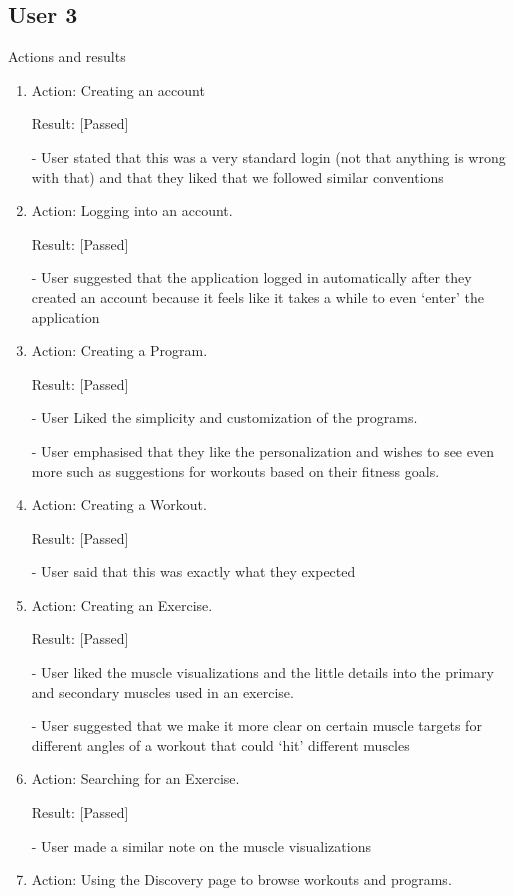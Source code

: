 \documentclass[12pt, titlepage]{article}
\begin{document}
\subsection{User 3}
Actions and results
\begin{enumerate}
\item Action: Creating an account

Result:  [Passed]

-	User stated that this was a very standard login (not that anything is wrong with that) and that they liked that we followed similar conventions

\item Action: Logging into an account.

Result: [Passed]

-	User suggested that the application logged in automatically after they created an account because it feels like it takes a while to even ‘enter’ the application


\item Action: Creating a Program.

Result: [Passed]

-	User Liked the simplicity and customization of the programs.

-	User emphasised that they like the personalization and wishes to see even more such as suggestions for workouts based on their fitness goals.


\item Action: Creating a Workout.

Result: [Passed]

-	User said that this was exactly what they expected 

\item Action: Creating an Exercise.

Result: [Passed]

-	User liked the muscle visualizations and the little details into the primary and secondary muscles used in an exercise.

-	User suggested that we make it more clear on certain muscle targets for different angles of a workout that could ‘hit’ different muscles


\item Action: Searching for an Exercise.

Result: [Passed]

-	User made a similar note on the muscle visualizations

\item Action: Using the Discovery page to browse workouts and programs.


\end{enumerate}
\end{document}
